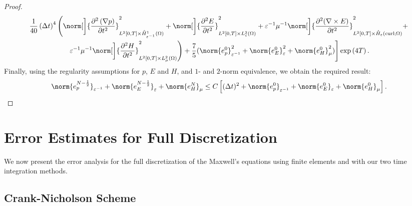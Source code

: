 \documentclass{amsart}
\theoremstyle{thmstyleone}%
\theoremstyle{thmstyletwo}%
\theoremstyle{thmstylethree}%
\DeclareMathOperator{\curl}{curl}
\begin{document}
\begin{proof}
\begin{multline*}
\dfrac{1}{40} \left( \Delta t \right)^4 \left(\norm[\bigg]{\dfrac{\partial^2 \left(\nabla p \right)}{\partial t^2}}^2_{L^2[0, T] \times \mathring{H}^1_{\varepsilon^{-1}}(\Omega)} + \norm[\bigg]{\dfrac{\partial^2 E}{\partial t^2}}^2_{L^2[0, T] \times L^2_\varepsilon(\Omega)} + \varepsilon^{-1} \mu^{-1} \norm[\bigg]{\dfrac{\partial^2 (\nabla \times E)}{\partial t^2}}^2_{L^2[0, T] \times \mathring{H}_\varepsilon(\curl; \Omega)} + \right. \\
\left. \varepsilon^{-1} \mu^{-1} \norm[\bigg]{\dfrac{\partial^2 H}{\partial t^2}}^2_{L^2[0, T] \times L^2_\mu(\Omega)} \right)  + \dfrac{7}{5} (\norm{e_p^0}^2_{\varepsilon^{-1}} + \norm{e_E^0}^2_{\varepsilon} + \norm{e_H^0}^2_{\mu})\Bigg] \exp \left( 4 T \right).
\end{multline*}
Finally, using the regularity assumptions for $p$, $E$ and $H$, and $1$- and $2$-norm equivalence, we obtain the required result:
\[
  \norm{e_p^{N - \frac{1}{2}}}_{\varepsilon^{-1}} + \norm{e_E^{N - \frac{1}{2}}}_{\varepsilon} + \norm{e_H^N}_{\mu} \le C \left[ (\Delta t)^2 + \norm{e_p^0}_{\varepsilon^{-1}} + \norm{e_E^0}_{\varepsilon} + \norm{e_H^0}_{\mu} \right]. \qedhere
\]
\end{proof}


\section{Error Estimates for Full Discretization} \label{sec:fllerrrestmts}

We now present the error analysis for the full discretization of the Maxwell's equations using finite elements and with our two time integration methods.

\subsection{Crank-Nicholson Scheme}\label{sec:cn_full_error}
\end{document}
